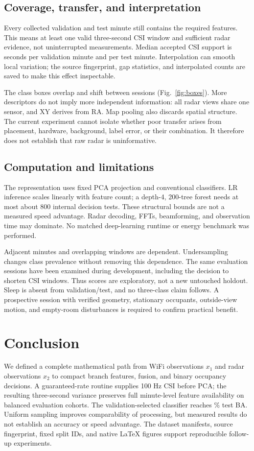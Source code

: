 \documentclass[conference,10pt,letterpaper]{IEEEtran}
\begin{document}
\subsection{Coverage, transfer, and interpretation}
Every collected validation and test minute still contains the required features. This means at least one valid three-second CSI window and sufficient radar evidence, not uninterrupted measurements. Median accepted CSI support is \ValValidSeconds{} seconds per validation minute and \TestValidSeconds{} per test minute. Interpolation can smooth local variation; the source fingerprint, gap statistics, and interpolated counts are saved to make this effect inspectable.

The class boxes overlap and shift between sessions (Fig.~\ref{fig:boxes}). More descriptors do not imply more independent information: all radar views share one sensor, and XY derives from RA. Map pooling also discards spatial structure. The current experiment cannot isolate whether poor transfer arises from placement, hardware, background, label error, or their combination. It therefore does not establish that raw radar is uninformative.

\subsection{Computation and limitations}
The representation uses fixed PCA projection and conventional classifiers. LR inference scales linearly with feature count; a depth-4, 200-tree forest needs at most about 800 internal decision tests. These structural bounds are not a measured speed advantage. Radar decoding, FFTs, beamforming, and observation time may dominate. No matched deep-learning runtime or energy benchmark was performed.

Adjacent minutes and overlapping windows are dependent. Undersampling changes class prevalence without removing this dependence. The same evaluation sessions have been examined during development, including the decision to shorten CSI windows. Thus scores are exploratory, not a new untouched holdout. Sleep is absent from validation/test, and no three-class claim follows. A prospective session with verified geometry, stationary occupants, outside-view motion, and empty-room disturbances is required to confirm practical benefit.

\section{Conclusion}
We defined a complete mathematical path from WiFi observations $x_1$ and radar observations $x_2$ to compact branch features, fusion, and binary occupancy decisions. A guaranteed-rate routine supplies 100 Hz CSI before PCA; the resulting three-second variance preserves full minute-level feature availability on balanced evaluation cohorts. The validation-selected classifier reaches \TestBA\% test BA. Uniform sampling improves comparability of processing, but measured results do not establish an accuracy or speed advantage. The dataset manifests, source fingerprint, fixed split IDs, and native LaTeX figures support reproducible follow-up experiments.
\end{document}
